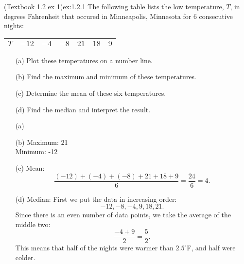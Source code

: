 \documentclass{article}
\begin{document}
\begin{example}{(Textbook 1.2 ex 1)}{ex:1.2.1}
    The following table lists the low temperature, $T$, in degrees Fahrenheit that occured in Minneapolis, Minnesota for 6 consecutive nights:
    \begin{center} 
    \begin{tabular}{|c|c|c|c|c|c|c|}\hline
        $T$ & $-12$ & $-4$ & $-8$ & $21$ & $18$ & $9$ \\ \hline
    \end{tabular}\end{center}
    \begin{enumerate}
        \item[(a)] Plot these temperatures on a number line.
        \item[(b)] Find the maximum and minimum of these temperatures.
        \item[(c)] Determine the mean of these six temperatures.
        \item[(d)] Find the median and interpret the result.
    \end{enumerate}
\end{example}
\begin{solution}
	\begin{enumerate}
        \item[(a)] $\quad$\\
        \item[(b)] Maximum: 21\\ Minimum: -12
        \item[(c)] Mean: \[\frac{(-12)+(-4)+(-8)+21+18+9}{6}=\frac{24}{6}=4.\]
        \item[(d)] Median: First we put the data in increasing order: 
        \[-12,-8,-4,9,18,21.\]
        Since there is an even number of data points, we take the average of the middle two:
        \[\frac{-4+9}{2}=\frac{5}{2}.\]
        This means that half of the nights were warmer than $2.5^\circ$F, and half were colder.
    \end{enumerate}
\end{solution}
\end{document}
